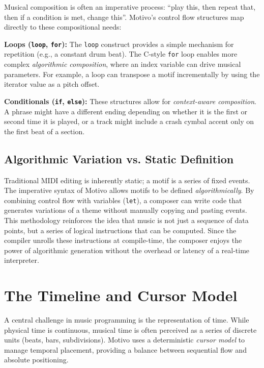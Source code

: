 Musical composition is often an imperative process: ``play this, then repeat that, then if a condition is met, change
this''.
Motivo's control flow structures map directly to these compositional needs:

\noindent \textbf{Loops (\texttt{loop}, \texttt{for}):} The \texttt{loop} construct provides a simple mechanism for
repetition (e.g., a constant drum beat).
The C-style \texttt{for} loop enables more complex \textit{algorithmic composition}, where an index variable can
drive musical parameters.
For example, a loop can transpose a motif incrementally by using the iterator value as a pitch offset.

\noindent \textbf{Conditionals (\texttt{if}, \texttt{else}):} These structures allow for \textit{context-aware
composition}.
A phrase might have a different ending depending on whether it is the first or second time it is played, or a track
might include a crash cymbal accent only on the first beat of a section.

\subsection{Algorithmic Variation vs. Static
Definition}\label{detail-subsec:algorithmic-variation-vs.-static-definition}

Traditional MIDI editing is inherently static; a motif is a series of fixed events.
The imperative syntax of Motivo allows motifs to be defined \textit{algorithmically}.
By combining control flow with variables (\texttt{let}), a composer can write code that generates variations of a theme
without manually copying and pasting events.
This methodology reinforces the idea that music is not just a sequence of data points, but a series of logical
instructions that can be computed.
Since the compiler unrolls these instructions at compile-time, the composer enjoys the power of algorithmic generation
without the overhead or latency of a real-time interpreter.


\section{The Timeline and Cursor Model}\label{detail-sec:temporal-logic}

A central challenge in music programming is the representation of time.
While physical time is continuous, musical time is often perceived as a series of discrete units (beats, bars,
subdivisions).
Motivo uses a deterministic \textit{cursor model} to manage temporal placement, providing a balance
between sequential flow and absolute positioning.

